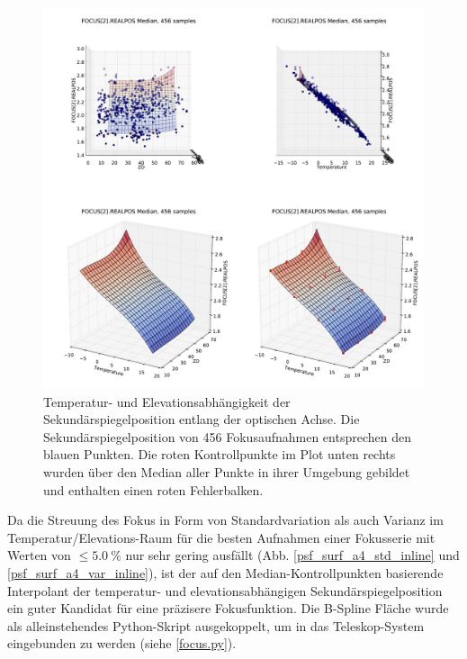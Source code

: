 \begin{figure}[H]
	\centering
	\includegraphics[scale=.44]{tsi_surf/POSITION_INSTRUMENTAL_FOCUS_2__REALPOS_med.pdf}
 	\caption[Temperatur- und Elevationsabhängigkeit der Sekundärspiegelposition]{Temperatur- und Elevationsabhängigkeit der Sekundärspiegelposition entlang der optischen Achse. Die Sekundärspiegelposition von 456 Fokusaufnahmen entsprechen den blauen Punkten. Die roten Kontrollpunkte im Plot unten rechts wurden über den Median aller Punkte in ihrer Umgebung gebildet und enthalten einen roten Fehlerbalken.}
    \label{foc_med_inline}
\end{figure}

Da die Streuung des Fokus in Form von Standardvariation als auch Varianz im Temperatur/Elevations-Raum für die besten Aufnahmen einer Fokusserie mit Werten von $\le\SI{5.0}{\percent}$ nur sehr gering ausfällt (Abb. \ref{psf_surf_a4_std_inline} und \ref{psf_surf_a4_var_inline}), ist der auf den Median-Kontrollpunkten basierende Interpolant der temperatur- und elevationsabhängigen Sekundärspiegelposition ein guter Kandidat für eine präzisere Fokusfunktion. Die B-Spline Fläche wurde als alleinstehendes Python-Skript ausgekoppelt, um in das Teleskop-System eingebunden zu werden (siehe \ref{focus.py}).

